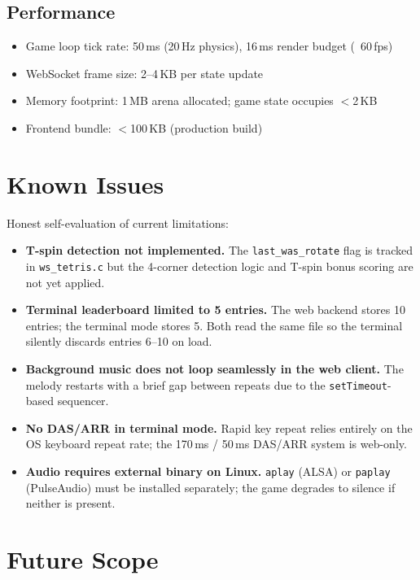 \documentclass[conference]{IEEEtran}
\begin{document}
\subsection{Performance}
\begin{itemize}
  \item Game loop tick rate: 50\,ms (20\,Hz physics), 16\,ms render budget (~60\,fps)
  \item WebSocket frame size: 2--4\,KB per state update
  \item Memory footprint: 1\,MB arena allocated; game state occupies $<$2\,KB
  \item Frontend bundle: $<$100\,KB (production build)
\end{itemize}

\section{Known Issues}

Honest self-evaluation of current limitations:

\begin{itemize}
  \item \textbf{T-spin detection not implemented.} The \texttt{last\_was\_rotate} flag is tracked in \texttt{ws\_tetris.c} but the 4-corner detection logic and T-spin bonus scoring are not yet applied.
  \item \textbf{Terminal leaderboard limited to 5 entries.} The web backend stores 10 entries; the terminal mode stores 5. Both read the same file so the terminal silently discards entries 6--10 on load.
  \item \textbf{Background music does not loop seamlessly in the web client.} The melody restarts with a brief gap between repeats due to the \texttt{setTimeout}-based sequencer.
  \item \textbf{No DAS/ARR in terminal mode.} Rapid key repeat relies entirely on the OS keyboard repeat rate; the 170\,ms / 50\,ms DAS/ARR system is web-only.
  \item \textbf{Audio requires external binary on Linux.} \texttt{aplay} (ALSA) or \texttt{paplay} (PulseAudio) must be installed separately; the game degrades to silence if neither is present.
\end{itemize}

\section{Future Scope}
\end{document}
